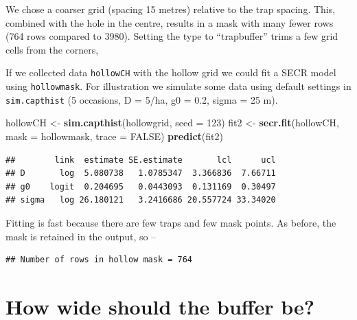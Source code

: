 \documentclass[
]{book}
\newenvironment{Shaded}{\begin{snugshade}}{\end{snugshade}}
\newcommand{\AttributeTok}[1]{\textcolor[rgb]{0.13,0.29,0.53}{#1}}
\newcommand{\ConstantTok}[1]{\textcolor[rgb]{0.56,0.35,0.01}{#1}}
\newcommand{\DecValTok}[1]{\textcolor[rgb]{0.00,0.00,0.81}{#1}}
\newcommand{\FunctionTok}[1]{\textcolor[rgb]{0.13,0.29,0.53}{\textbf{#1}}}
\newcommand{\NormalTok}[1]{#1}
\newcommand{\OtherTok}[1]{\textcolor[rgb]{0.56,0.35,0.01}{#1}}
\newcommand{\SpecialCharTok}[1]{\textcolor[rgb]{0.81,0.36,0.00}{\textbf{#1}}}
\newcommand{\StringTok}[1]{\textcolor[rgb]{0.31,0.60,0.02}{#1}}
\begin{document}
We chose a coarser grid (spacing 15 metres) relative to the trap spacing. This, combined with the hole in the centre, results in a mask with many fewer rows (764 rows compared to 3980). Setting the type to ``trapbuffer'' trims a few grid cells from the corners,

If we collected data \texttt{hollowCH} with the hollow grid we could fit a SECR model using \texttt{hollowmask}. For illustration we simulate some data using default settings in \texttt{sim.capthist} (5 occasions, D = 5/ha, g0 = 0.2, sigma = 25 m).

\begin{Shaded}
\begin{Highlighting}[]
\NormalTok{hollowCH }\OtherTok{\textless{}{-}} \FunctionTok{sim.capthist}\NormalTok{(hollowgrid, }\AttributeTok{seed =} \DecValTok{123}\NormalTok{)}
\NormalTok{fit2 }\OtherTok{\textless{}{-}} \FunctionTok{secr.fit}\NormalTok{(hollowCH, }\AttributeTok{mask =}\NormalTok{ hollowmask, }\AttributeTok{trace =} \ConstantTok{FALSE}\NormalTok{)}
\FunctionTok{predict}\NormalTok{(fit2)}
\end{Highlighting}
\end{Shaded}

\begin{verbatim}
##        link  estimate SE.estimate       lcl      ucl
## D       log  5.080738   1.0785347  3.366836  7.66711
## g0    logit  0.204695   0.0443093  0.131169  0.30497
## sigma   log 26.180121   3.2416686 20.557724 33.34020
\end{verbatim}

Fitting is fast because there are few traps and few mask points. As before, the mask is retained in the output, so --

\begin{Shaded}
\end{Shaded}

\begin{verbatim}
## Number of rows in hollow mask = 764
\end{verbatim}

\section{How wide should the buffer be?}\label{bufferwidth}
\end{document}
